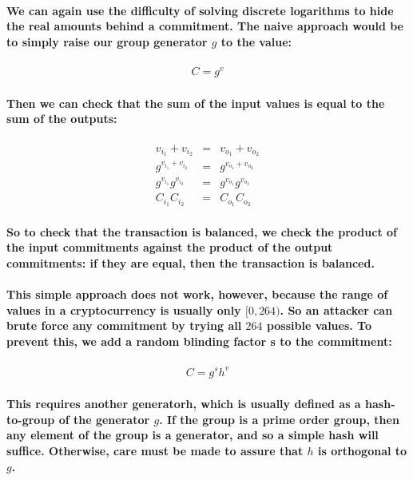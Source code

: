\documentclass{article}
\begin{document}
\paragraph{We can again use the difficulty of solving discrete logarithms to hide the real amounts behind a commitment.  The naive approach would be to simply raise our group generator $g$ to the value:}

\begin{eqnarray}
  C=g^v
\end{eqnarray}

\paragraph{Then we can check that the sum of the input values is equal to the sum of the outputs:}

\begin{eqnarray}
  v_{i_1} + v_{i_2} &=& v_{o_1} + v_{o_2}\\
  g^{v_{i_1} + v_{i_2}} &=& g^{v_{o_1} + v_{o_2}}\\
  g^{v_{i_1}} g^{v_{i_2}} &=& g^{v_{o_1}} g^{v_{o_2}}\\
  C_{i_1} C_{i_2} &=& C_{o_1} C_{o_2}
\end{eqnarray}
  
\paragraph{So to check that the transaction is balanced, we check the product of the input commitments against the product of the output commitments: if they are equal, then the transaction is balanced.}

\paragraph{This simple approach does not work, however, because the range of values in a cryptocurrency is usually only $[0, 264)$.  So an attacker can brute force any commitment by trying all $264$ possible values.  To prevent this, we add a random blinding factor s to the commitment:}

\begin{eqnarray}
  C = g^s h^v
\end{eqnarray}
  
\paragraph{This requires another generatorh, which is usually defined as a hash-to-group of the generator $g$.  If the group is a prime order group, then any element of the group is a generator, and so a simple hash will suffice.  Otherwise, care must be made to assure that $h$ is orthogonal to $g$.}
\end{document}
